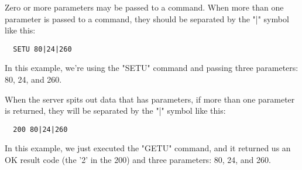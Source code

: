  Zero or more parameters may be passed to a command.  When more than one
parameter is passed to a command, they should be separated by the "|"
symbol like this:

\begin{verbatim}
  SETU 80|24|260
\end{verbatim}

 In this example, we're using the "SETU" command and passing three
parameters: 80, 24, and 260.

 When the server spits out data that has parameters, if more than one
parameter is returned, they will be separated by the "|" symbol like
this:

\begin{verbatim}
  200 80|24|260
\end{verbatim}

 In this example, we just executed the "GETU" command, and it returned us
an OK result code (the '2' in the 200) and three parameters: 80, 24, and
260.
